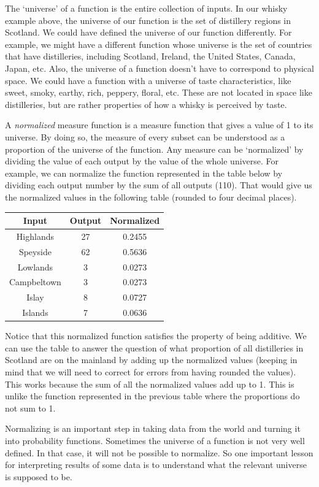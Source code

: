 \documentclass[]{tufte-book}
\begin{document}
The `universe' of a function is the entire collection of inputs. In our whisky example above, the universe of our function is the set of distillery regions in Scotland. We could have defined the universe of our function differently. For example, we might have a different function whose universe is the set of countries that have distilleries, including Scotland, Ireland, the United States, Canada, Japan, etc. Also, the universe of a function doesn't have to correspond to physical space. We could have a function with a universe of taste characteristics, like sweet, smoky, earthy, rich, peppery, floral, etc. These are not located in space like distilleries, but are rather properties of how a whisky is perceived by taste.

A \emph{normalized} measure function is a measure function that gives a value of 1 to its universe. By doing so, the measure of every subset can be understood as a proportion of the universe of the function. Any measure can be `normalized' by dividing the value of each output by the value of the whole universe. For example, we can normalize the function represented in the table below by dividing each output number by the sum of all outputs (110). That would give us the normalized values in the following table (rounded to four decimal places).

\begin{longtable}[]{@{}ccc@{}}
\toprule
Input & Output & Normalized\tabularnewline
\midrule
\endhead
Highlands & 27 & 0.2455\tabularnewline
Speyside & 62 & 0.5636\tabularnewline
Lowlands & 3 & 0.0273\tabularnewline
Campbeltown & 3 & 0.0273\tabularnewline
Islay & 8 & 0.0727\tabularnewline
Islands & 7 & 0.0636\tabularnewline
\bottomrule
\end{longtable}

Notice that this normalized function satisfies the property of being additive. We can use the table to answer the question of what proportion of all distilleries in Scotland are on the mainland by adding up the normalized values (keeping in mind that we will need to correct for errors from having rounded the values). This works because the sum of all the normalized values add up to 1. This is unlike the function represented in the previous table where the proportions do not sum to 1.

Normalizing is an important step in taking data from the world and turning it into probability functions. Sometimes the universe of a function is not very well defined. In that case, it will not be possible to normalize. So one important lesson for interpreting results of some data is to understand what the relevant universe is supposed to be.
\end{document}
